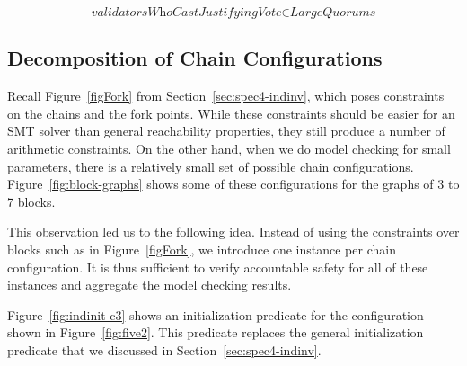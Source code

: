 \begin{equation}
    \textit{validatorsWhoCastJustifyingVote} \in \textit{LargeQuorums}
    \label{eq:card-comparison3}
\end{equation}


\subsection{Decomposition of Chain Configurations}\label{sec:decomposition}

Recall Figure~\ref{figFork} from Section~\ref{sec:spec4-indinv}, which poses
constraints on the chains and the fork points. While these constraints should
be easier for an SMT solver than general reachability properties, they
still produce a number of arithmetic constraints. On the other hand, when we do
model checking for small parameters, there is a relatively small set of
possible chain configurations.  Figure~\ref{fig:block-graphs} shows some of
these configurations for the graphs of 3 to 7 blocks.

This observation led us to the following idea. Instead of using the constraints
over blocks such as in Figure~\ref{figFork}, we introduce one instance per
chain configuration. It is thus sufficient to verify accountable safety for all
of these instances and aggregate the model checking results.

Figure~\ref{fig:indinit-c3} shows an initialization predicate for the
configuration shown in Figure~\ref{fig:five2}. This predicate replaces the
general initialization predicate that we discussed in
Section~\ref{sec:spec4-indinv}.

